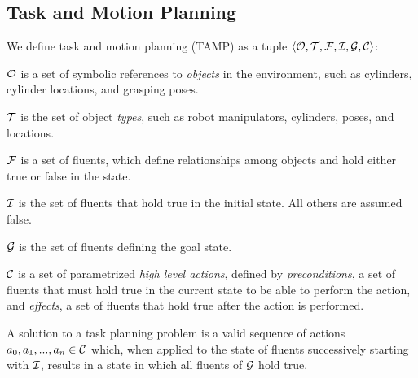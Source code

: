 \subsection{Task and Motion Planning}
We define task and motion planning (TAMP) as a tuple $\langle \mathcal{O}, \mathcal{T}, \mathcal{F}, \mathcal{I}, \mathcal{G}, \mathcal{C} \rangle$:
\begin{tightlist}
\item $\mathcal{O}$ is a set of symbolic references to \emph{objects} in the environment,
such as cylinders, cylinder locations, and grasping poses.
\item $\mathcal{T}$ is the set of object \emph{types}, such as robot manipulators, cylinders, poses, and locations.
\item $\mathcal{F}$ is a set of fluents, which define relationships among objects and hold either
true or false in the state.
\item $\mathcal{I}$ is the set of fluents that hold true in the initial state. All others are assumed false.
\item $\mathcal{G}$ is the set of fluents defining the goal state.
\item $\mathcal{C}$ is a set of parametrized \emph{high level actions}, defined by \emph{preconditions}, a set
of fluents that must hold true in the current state to be able to perform the action,
and \emph{effects}, a set of fluents that hold true after the action is performed.
\end{tightlist}
A solution to a task planning problem is a valid sequence of actions
$a_{0}, a_{1}, ..., a_{n} \in \mathcal{C}$ which, when applied to the state of fluents
successively starting with $\mathcal{I}$, results in a state in which all fluents of
$\mathcal{G}$ hold true.




